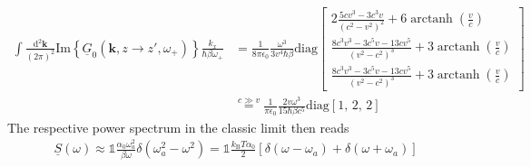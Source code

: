 \documentclass[11pt]{article}
\newcommand{\vv}[1]{\mathbf{#1}}
\newcommand{\dd}[0]{\mathrm{d}}
\DeclareMathOperator\arctanh{arctanh}
\begin{document}
\begin{align}
  \int\frac{\dd^2\vv k}{(2\pi)^2}  \mathrm{Im}\left\{\underline{G}_0(\vv k, z\to z',\omega_+)\right\}\frac{k_x}{\hbar\beta\omega_+} 
  &=
  \frac{1}{8\pi\epsilon_0}
  \frac{\omega^3}{3v^4\hbar\beta}
  \mathrm{diag}
  \begin{bmatrix}
    2\frac{5 c v^3-3 c^3 v}{\left(c^2-v^2\right)^2}+6 \arctanh\left(\frac{v}{c}\right)
    \\
    \frac{8 c^3 v^3-3 c^5 v-13c v^5}{\left(v^2-c^2\right)^3}+3 \arctanh\left(\frac{v}{c}\right)
    \\
    \frac{8 c^3 v^3-3 c^5 v-13c v^5}{\left(v^2-c^2\right)^3}+3 \arctanh\left(\frac{v}{c}\right)
  \end{bmatrix}
  \\
  &\stackrel{c\gg v}=
  \frac{1}{\pi\epsilon_0}
  \frac{2 v \omega^3}{15 \hbar\beta c^5}
  \mathrm{diag}\left[1,\,2,\,2\right]
\end{align}
The respective power spectrum in the classic limit then reads
\begin{align}
  \underline{S}(\omega)\approx\mathbb{1}
  \frac{ \alpha_0 \omega_a^2}{\beta\omega}\delta(\omega_a^2-\omega^2)=\mathbb{1}\frac{k_\mathrm{B}T\alpha_0}{2}\left[\delta(\omega-\omega_a)+\delta(\omega+\omega_a)\right]
\end{align}

\end{document}
